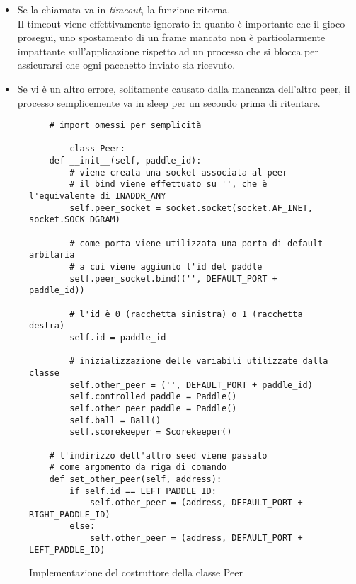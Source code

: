 \begin{itemize}
\begin{itemize}
            \item Se la chiamata va in \textit{timeout}, la funzione ritorna. \\
            Il timeout viene effettivamente ignorato in quanto è importante che il gioco prosegui, uno spostamento
            di un frame mancato non è particolarmente impattante sull'applicazione rispetto ad un processo che si blocca
            per assicurarsi che ogni pacchetto inviato sia ricevuto.
            \item Se vi è un altro errore, solitamente causato dalla mancanza dell'altro peer, il processo semplicemente
            va in sleep per un secondo prima di ritentare.
        \end{itemize}
\end{itemize}

\begin{figure}
    \begin{verbatim}
    # import omessi per semplicità

        class Peer:
    def __init__(self, paddle_id):
        # viene creata una socket associata al peer
        # il bind viene effettuato su '', che è l'equivalente di INADDR_ANY
        self.peer_socket = socket.socket(socket.AF_INET, socket.SOCK_DGRAM)

        # come porta viene utilizzata una porta di default arbitaria
        # a cui viene aggiunto l'id del paddle
        self.peer_socket.bind(('', DEFAULT_PORT + paddle_id))

        # l'id è 0 (racchetta sinistra) o 1 (racchetta destra)
        self.id = paddle_id

        # inizializzazione delle variabili utilizzate dalla classe
        self.other_peer = ('', DEFAULT_PORT + paddle_id)
        self.controlled_paddle = Paddle()
        self.other_peer_paddle = Paddle()
        self.ball = Ball()
        self.scorekeeper = Scorekeeper()

    # l'indirizzo dell'altro seed viene passato
    # come argomento da riga di comando
    def set_other_peer(self, address):
        if self.id == LEFT_PADDLE_ID:
            self.other_peer = (address, DEFAULT_PORT + RIGHT_PADDLE_ID)
        else:
            self.other_peer = (address, DEFAULT_PORT + LEFT_PADDLE_ID)
    \end{verbatim}
    \caption{Implementazione del costruttore della classe Peer}
    \label{fig:peer1}
\end{figure}

